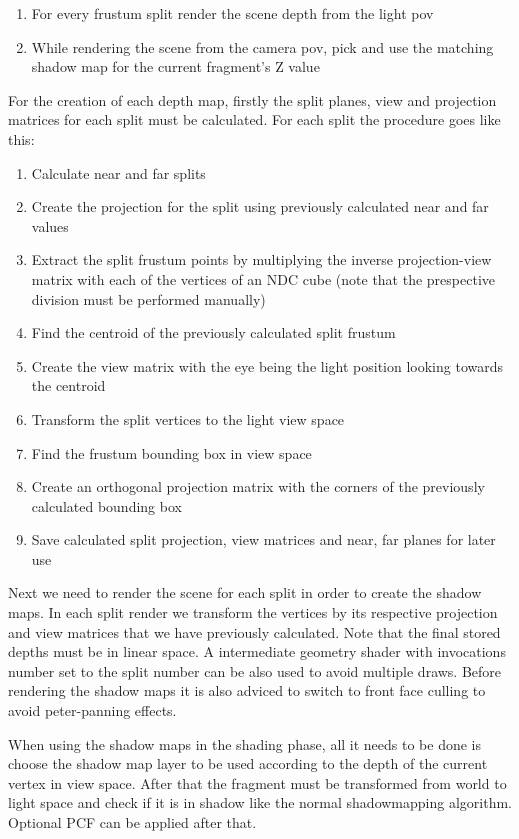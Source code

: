 \begin{enumerate}
\item For every frustum split render the scene depth from the light pov
\item While rendering the scene from the camera pov, pick and use the matching shadow map for the current
    fragment's Z value
\end{enumerate}

For the creation of each depth map, firstly the split planes, view and projection matrices for each split
must be calculated. For each split the procedure goes like this:

\begin{enumerate}
\item Calculate near and far splits
\item Create the projection for the split using previously calculated near and far values
\item Extract the split frustum points by multiplying the inverse projection-view matrix
    with each of the vertices of an NDC cube (note that the prespective division must
    be performed manually)
\item Find the centroid of the previously calculated split frustum
\item Create the view matrix with the eye being the light position looking towards the centroid
\item Transform the split vertices to the light view space
\item Find the frustum bounding box in view space
\item Create an orthogonal projection matrix with the corners of the previously calculated bounding box
\item Save calculated split projection, view matrices and near, far planes for later use
\end{enumerate}

Next we need to render the scene for each split in order to create the shadow maps.
In each split render we transform the vertices by its respective projection and view matrices
that we have previously calculated. Note that the final stored depths must be in linear space.
A intermediate geometry shader with invocations number set to the split number can be also used
to avoid multiple draws. Before rendering the shadow maps it is also adviced to switch to front
face culling to avoid peter-panning effects.

When using the shadow maps in the shading phase, all it needs to be done is choose the shadow
map layer to be used according to the depth of the current vertex in view space. After that
the fragment must be transformed from world to light space and check if it is in shadow like
the normal shadowmapping algorithm. Optional PCF can be applied after that.
